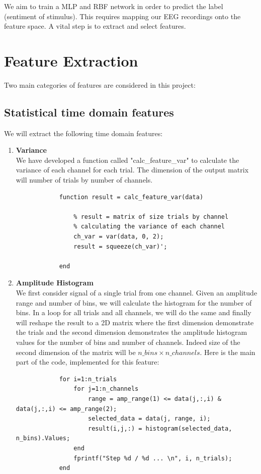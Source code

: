 \documentclass[]{article}
\begin{document}
	We aim to train a MLP and RBF network in order to predict the label (sentiment of stimulus). This requires mapping our EEG recordings onto the feature space. A vital step is to extract and select features.

	\section{Feature Extraction}
	Two main categories of features are considered in this project:
	
	\subsection{Statistical time domain features}
	We will extract the following time domain features:
	\begin{enumerate}
		\item \textbf{Variance} \\
		We have developed a function called "calc\_feature\_var" to calculate the variance of each channel for each trial. The dimension of the output matrix will number of trials by number of channels.
		\begin{lstlisting}
			function result = calc_feature_var(data)
			
				% result = matrix of size trials by channel
				% calculating the variance of each channel
				ch_var = var(data, 0, 2);
				result = squeeze(ch_var)';
			
			end
		\end{lstlisting}
	
		\item \textbf{Amplitude Histogram}\\
		We first consider signal of a single trial from one channel. Given an amplitude range and number of bins, we will calculate the histogram for the number of bins. In a loop for all trials and all channels, we will do the same and finally will reshape the result to a 2D matrix where the first dimension demonstrate the trials and the second dimension demonstrates the amplitude histogram values for the number of bins and number of channels. Indeed size of the second dimension of the matrix will be $n\_bins \times n\_channels$. Here is the main part of the code, implemented for this feature:
		\begin{lstlisting}
			for i=1:n_trials
				for j=1:n_channels
					range = amp_range(1) <= data(j,:,i) & data(j,:,i) <= amp_range(2);
					selected_data = data(j, range, i);
					result(i,j,:) = histogram(selected_data, n_bins).Values;
				end
				fprintf("Step %d / %d ... \n", i, n_trials);
			end
			

\end{lstlisting}
\end{enumerate}
\end{document}
